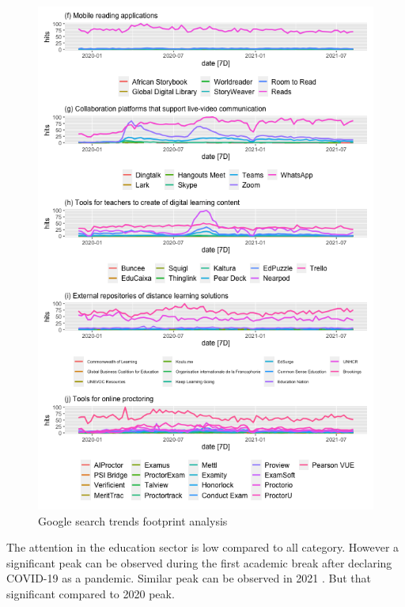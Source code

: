 \documentclass[11pt,a4paper,]{article}
\begin{document}
\begin{figure}[h]

{\centering \includegraphics[width=1\textwidth]{figure/plot2-1} 

}

\caption{Google search trends footprint analysis}\label{fig:plot2}
\end{figure}

The attention in the education sector is low compared to all category. However a significant peak can be observed during the first academic break after declaring COVID-19 as a pandemic. Similar peak can be observed in 2021 . But that significant compared to 2020 peak.
\end{document}
